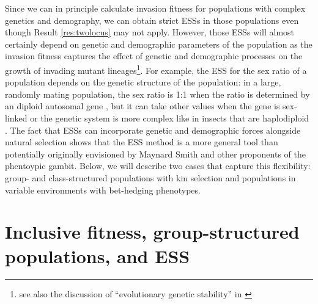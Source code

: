 \documentclass[11pt]{article}
\begin{document}
Since we can in principle calculate invasion fitness for populations with complex genetics and demography, we can obtain strict ESSs in those populations even though Result \ref{res:twolocus} may not apply. However, those ESSs will almost certainly depend on genetic and demographic parameters of the population as the invasion fitness captures the effect of genetic and demographic processes on the growth of invading mutant lineages\footnote{see also the discussion of ``evolutionary genetic stability'' in \cite[pp. 505--506]{Eshel:1996}}. For example, the ESS for the sex ratio of a population depends on the genetic structure of the population: in a large, randomly mating population, the sex ratio is 1:1 when the ratio is determined by an diploid autosomal gene \cite{Fisher:1958,Hamilton:1967,Eshel:Feldman:1982}, but it can take other values when the gene is sex-linked or the genetic system is more complex like in insects that are haplodiploid \cite{Hamilton:1967,Eshel:Feldman:1982a}. The fact that ESSs can incorporate genetic and demographic forces alongside natural selection shows that the ESS method is a more general tool than potentially originally envisioned by Maynard Smith and other proponents of the phentoypic gambit. Below, we will describe two cases that capture this flexibility: group- and class-structured populations with kin selection and populations in variable environments with bet-hedging phenotypes.

\section{Inclusive fitness, group-structured populations, and ESS}
\label{sec:IF:group-structure}
\end{document}
